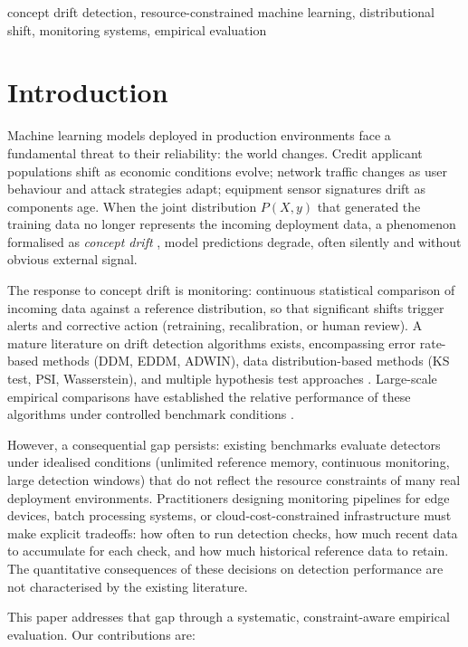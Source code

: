 \documentclass[conference]{IEEEtran}
\begin{document}
\begin{IEEEkeywords}
concept drift detection, resource-constrained machine learning, distributional shift, monitoring systems, empirical evaluation
\end{IEEEkeywords}

\section{Introduction}

Machine learning models deployed in production environments face a fundamental threat to their reliability: the world changes. Credit applicant populations shift as economic conditions evolve; network traffic changes as user behaviour and attack strategies adapt; equipment sensor signatures drift as components age. When the joint distribution $P(X, y)$ that generated the training data no longer represents the incoming deployment data, a phenomenon formalised as \emph{concept drift} \cite{gama2013}, model predictions degrade, often silently and without obvious external signal.

The response to concept drift is monitoring: continuous statistical comparison of incoming data against a reference distribution, so that significant shifts trigger alerts and corrective action (retraining, recalibration, or human review). A mature literature on drift detection algorithms exists, encompassing error rate-based methods (DDM, EDDM, ADWIN), data distribution-based methods (KS test, PSI, Wasserstein), and multiple hypothesis test approaches \cite{lu2019}. Large-scale empirical comparisons have established the relative performance of these algorithms under controlled benchmark conditions \cite{barros2018, lukats2024}.

However, a consequential gap persists: existing benchmarks evaluate detectors under idealised conditions (unlimited reference memory, continuous monitoring, large detection windows) that do not reflect the resource constraints of many real deployment environments. Practitioners designing monitoring pipelines for edge devices, batch processing systems, or cloud-cost-constrained infrastructure must make explicit tradeoffs: how often to run detection checks, how much recent data to accumulate for each check, and how much historical reference data to retain. The quantitative consequences of these decisions on detection performance are not characterised by the existing literature.

This paper addresses that gap through a systematic, constraint-aware empirical evaluation. Our contributions are:
\end{document}
